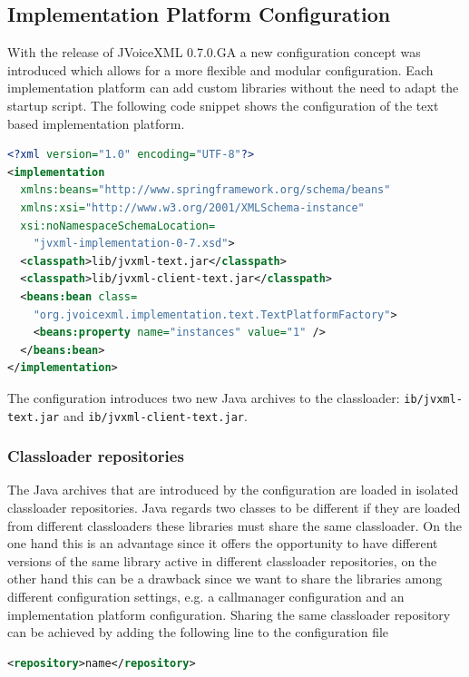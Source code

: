 \documentclass[11pt,a4paper]{article}
\begin{document}
\subsection{Implementation Platform Configuration}
\label{sec:impl-platform-config}

With the release of JVoiceXML 0.7.0.GA a new configuration concept was
introduced which allows for a more flexible and modular configuration. Each
implementation platform can add custom libraries without the need to adapt the
startup script. The following code snippet shows the configuration of the text
based implementation platform.

\begin{lstlisting}[language=XML]
<?xml version="1.0" encoding="UTF-8"?>
<implementation
  xmlns:beans="http://www.springframework.org/schema/beans"
  xmlns:xsi="http://www.w3.org/2001/XMLSchema-instance"
  xsi:noNamespaceSchemaLocation=
    "jvxml-implementation-0-7.xsd">
  <classpath>lib/jvxml-text.jar</classpath>
  <classpath>lib/jvxml-client-text.jar</classpath>
  <beans:bean class=
    "org.jvoicexml.implementation.text.TextPlatformFactory">
    <beans:property name="instances" value="1" />
  </beans:bean>
</implementation>
\end{lstlisting}

The configuration introduces two new Java archives to the classloader:
\lstinline{ib/jvxml-text.jar} and \lstinline{ib/jvxml-client-text.jar}.

\subsubsection{Classloader repositories}

The Java archives that are introduced by the configuration are loaded in isolated
classloader repositories. Java regards two classes to be different if they are
loaded from different classloaders these libraries must share the same
classloader. On the one hand this is an advantage since it offers the opportunity
to have different versions of the same library active in different classloader
repositories, on the other hand this can be a drawback since we want to share the
libraries among different configuration settings, e.g. a callmanager
configuration and an implementation platform configuration. Sharing the same
classloader repository can be achieved by adding the following line to the
configuration file

\begin{lstlisting}[language=XML]
<repository>name</repository>
\end{lstlisting}
\end{document}
